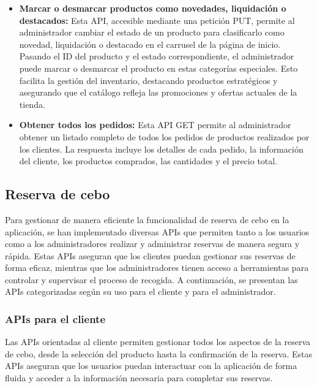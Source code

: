 \begin{itemize}
    \item \textbf{Marcar o desmarcar productos como novedades, liquidación o destacados:} Esta API, accesible mediante una petición PUT, permite al administrador cambiar el estado de un producto para clasificarlo como novedad, liquidación o destacado en el carrusel de la página de inicio. Pasando el ID del producto y el estado correspondiente, el administrador puede marcar o desmarcar el producto en estas categorías especiales. Esto facilita la gestión del inventario, destacando productos estratégicos y asegurando que el catálogo refleja las promociones y ofertas actuales de la tienda.

    \item \textbf{Obtener todos los pedidos:} Esta API GET permite al administrador obtener un listado completo de todos los pedidos de productos realizados por los clientes. La respuesta incluye los detalles de cada pedido, la información del cliente, los productos comprados, las cantidades y el precio total.

    
\end{itemize}

\subsection{Reserva de cebo}\label{subsec5.3.3}

Para gestionar de manera eficiente la funcionalidad de reserva de cebo en la aplicación, se han implementado diversas APIs que permiten tanto a los usuarios como a los administradores realizar y administrar reservas de manera segura y rápida. Estas APIs aseguran que los clientes puedan gestionar sus reservas de forma eficaz, mientras que los administradores tienen acceso a herramientas para controlar y supervisar el proceso de recogida. A continuación, se presentan las APIs categorizadas según su uso para el cliente y para el administrador.

\vspace{0.5cm}

\subsubsection{APIs para el cliente}\label{subsec5.3.3.1}

Las APIs orientadas al cliente permiten gestionar todos los aspectos de la reserva de cebo, desde la selección del producto hasta la confirmación de la reserva. Estas APIs aseguran que los usuarios puedan interactuar con la aplicación de forma fluida y acceder a la información necesaria para completar sus reservas.

